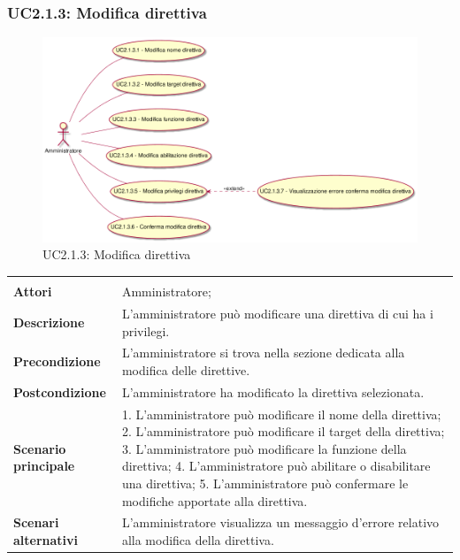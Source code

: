 \subsubsection{UC2.1.3: Modifica direttiva}
\label{UC2.1.3}\newpage
\begin{figure}[h]
\centering
\includegraphics[width=\textwidth,height=\textheight,keepaspectratio]{images/UseCaseUC2.1.3.png}
\caption{UC2.1.3: Modifica direttiva}
\end{figure}
\begin{longtable}{l|p{10cm}}
\hline
&\\
\textbf{Attori} & Amministratore;\\[7pt]
\textbf{Descrizione} & L'amministratore può modificare una direttiva di cui ha i privilegi. \\[7pt]
\textbf{Precondizione} & L'amministratore si trova nella sezione dedicata alla modifica delle direttive.\\[7pt]
\textbf{Postcondizione} & L'amministratore ha modificato la direttiva selezionata.\\[7pt]
\textbf{Scenario principale} & 1. L'amministratore può modificare il nome della direttiva;
2. L'amministratore può modificare il target della direttiva;
3. L'amministratore può modificare la funzione della direttiva;
4. L'amministratore può abilitare o disabilitare una direttiva;
5. L'amministratore può confermare le modifiche apportate alla direttiva.
\\[7pt]
\textbf{Scenari alternativi} & L'amministratore visualizza un messaggio d'errore relativo alla modifica della direttiva.\\[7pt]\hline
\end{longtable}

